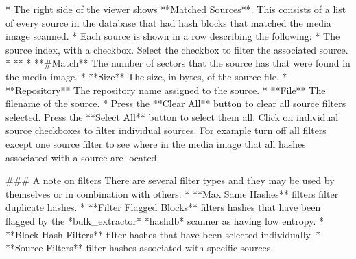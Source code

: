 \documentclass[11pt,fleqn]{article} %
\begin{document}
\begin{itemize}
* The right side of the viewer shows **Matched Sources**.  This consists of a list of every source in the database that had hash blocks that matched the media image scanned.
  * Each source is shown in a row describing the following:
    * The source index, with a checkbox.  Select the checkbox to filter the associated source.
    * **%
    * **#Match** The number of sectors that the source has that were found in the media image.
    * **Size** The size, in bytes, of the source file.
    * **Repository** The repository name assigned to the source.
    * **File** The filename of the source.
  * Press the **Clear All** button to clear all source filters selected.  Press the **Select All** button to select them all.  Click on individual source checkboxes to filter individual sources.  For example turn off all filters except one source filter to see where in the media image that all hashes associated with a source are located.

### A note on filters
There are several filter types and they may be used by themselves or in combination with others:
* **Max Same Hashes** filters filter duplicate hashes.
* **Filter Flagged Blocks** filters hashes that have been flagged by the *bulk_extractor* *hashdb* scanner as having low entropy.
* **Block Hash Filters** filter hashes that have been selected individually.
* **Source Filters** filter hashes associated with specific sources.










































































\end{itemize}
\end{document}
